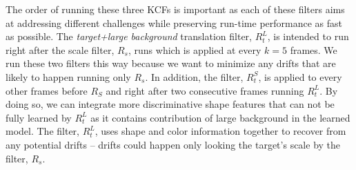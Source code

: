 \documentclass{bmvc2k}
\begin{document}
The order of running these three KCFs is important as each of these
filters aims at addressing different challenges while preserving
run-time performance as fast as possible. The \textit{target+large
  background} translation filter, $R_{t}^{L}$, is intended to run
right after the scale filter, $R_s$, runs which is applied at every
$k=5$ frames. We run these two filters this way because we want to
minimize any drifts that are likely to happen running only $R_{s}$. In
addition, the filter, $R_{t}^{S}$, is applied to every other frames
before $R_{S}$ and right after two consecutive frames running
$R_{t}^{L}$. By doing so, we can integrate more discriminative shape
features that can not be fully learned by $R_{t}^{L}$ as it contains
contribution of large background in the learned model. The filter,
$R_{t}^{L}$, uses shape and color information together to recover from
any potential drifts -- drifts could happen only looking the target's
scale by the filter, $R_{s}$.
\end{document}
